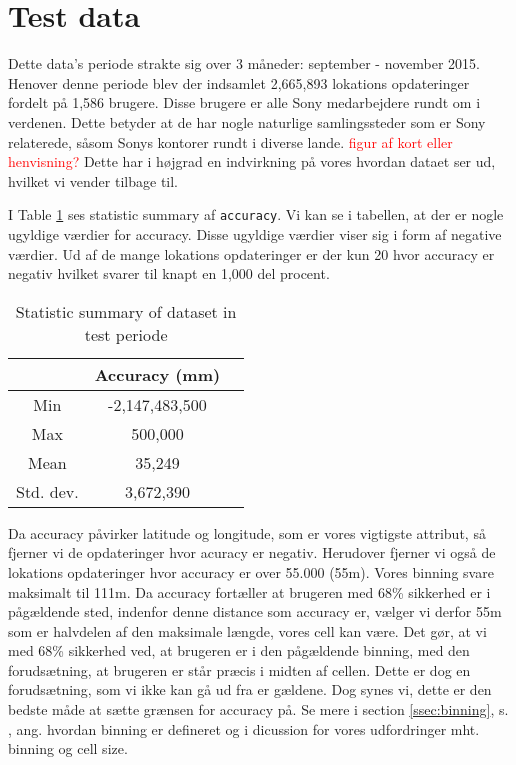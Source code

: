 \section{Test data}
Dette data's periode strakte sig over 3 måneder: september - november 2015. 
Henover denne periode blev der indsamlet 2,665,893 lokations opdateringer fordelt på 1,586 brugere. Disse brugere er alle Sony medarbejdere rundt om i verdenen. Dette betyder at de har nogle naturlige samlingssteder som er Sony relaterede, såsom Sonys kontorer rundt i diverse lande. \textcolor{red}{figur af kort eller henvisning?}
Dette har i højgrad en indvirkning på vores hvordan dataet ser ud, hvilket vi vender tilbage til. 

I Table \ref{tab:stat_geo_p1} ses statistic summary af \texttt{accuracy}.
Vi kan se i tabellen, at der er nogle ugyldige værdier for accuracy. Disse ugyldige værdier viser sig i form af negative værdier. 
Ud af de mange lokations opdateringer er der kun 20 hvor accuracy er negativ hvilket svarer til knapt en 1,000 del procent. 
\begin{table}[H]
        \centering
        \small
        \setlength\tabcolsep{2pt}
        \begin{tabular}{|c|c|c|}
            \hline
                         & Accuracy (mm)          \\[0pt]%
            \hline
                 Min     &  -2,147,483,500             \\
            \hline
                 Max     &  500,000                \\
            \hline
                 Mean    & 35,249                      \\
            \hline
                Std. dev.   & 3,672,390                \\
            \hline
        \end{tabular}
        \caption{Statistic summary of dataset in test periode} %
        \label{tab:stat_geo_p1}
\end{table}

Da accuracy påvirker latitude og longitude, som er vores vigtigste attribut, så fjerner vi de opdateringer hvor acuracy er negativ. Herudover fjerner vi også de lokations opdateringer hvor accuracy er over 55.000 (55m). Vores binning svare maksimalt til 111m. Da accuracy fortæller at brugeren med 68\% sikkerhed er i pågældende sted, indenfor denne distance som accuracy er, vælger vi derfor 55m som er halvdelen af den maksimale længde, vores cell kan være. Det gør, at vi med 68\% sikkerhed ved, at brugeren er i den pågældende binning, med den forudsætning, at brugeren er står præcis i midten af cellen. Dette er dog en forudsætning, som vi ikke kan gå ud fra er gældene. Dog synes vi, dette er den bedste måde at sætte grænsen for accuracy på. 
Se mere i section \ref{ssec:binning}, s. \pageref{ssec:binning}, ang. hvordan binning er defineret og i dicussion for vores udfordringer mht. binning og cell size. 

